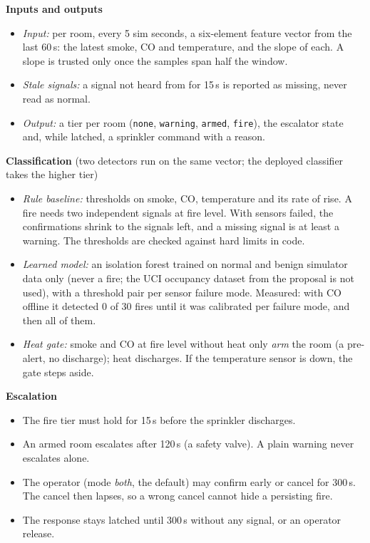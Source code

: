 \documentclass[11pt]{article}
\providecommand{\tightlist}{\setlength{\itemsep}{0pt}\setlength{\parskip}{0pt}}
\newcommand{\code}[1]{\texttt{#1}}
\begin{document}
\textbf{Inputs and outputs}
\begin{itemize}\tightlist
\item \emph{Input:} per room, every 5 sim seconds, a six-element feature vector from the last 60\,s: the latest smoke, CO and temperature, and the slope of each. A slope is trusted only once the samples span half the window.
\item \emph{Stale signals:} a signal not heard from for 15\,s is reported as missing, never read as normal.
\item \emph{Output:} a tier per room (\code{none}, \code{warning}, \code{armed}, \code{fire}), the escalator state and, while latched, a sprinkler command with a reason.
\end{itemize}

\textbf{Classification} (two detectors run on the same vector; the deployed classifier takes the higher tier)
\begin{itemize}\tightlist
\item \emph{Rule baseline:} thresholds on smoke, CO, temperature and its rate of rise. A fire needs two independent signals at fire level. With sensors failed, the confirmations shrink to the signals left, and a missing signal is at least a warning. The thresholds are checked against hard limits in code.
\item \emph{Learned model:} an isolation forest trained on normal and benign simulator data only (never a fire; the UCI occupancy dataset from the proposal is not used), with a threshold pair per sensor failure mode. Measured: with CO offline it detected 0 of 30 fires until it was calibrated per failure mode, and then all of them.
\item \emph{Heat gate:} smoke and CO at fire level without heat only \emph{arm} the room (a pre-alert, no discharge); heat discharges. If the temperature sensor is down, the gate steps aside.
\end{itemize}

\textbf{Escalation}
\begin{itemize}\tightlist
\item The fire tier must hold for 15\,s before the sprinkler discharges.
\item An armed room escalates after 120\,s (a safety valve). A plain warning never escalates alone.
\item The operator (mode \emph{both}, the default) may confirm early or cancel for 300\,s. The cancel then lapses, so a wrong cancel cannot hide a persisting fire.
\item The response stays latched until 300\,s without any signal, or an operator release.
\end{itemize}
\end{document}
